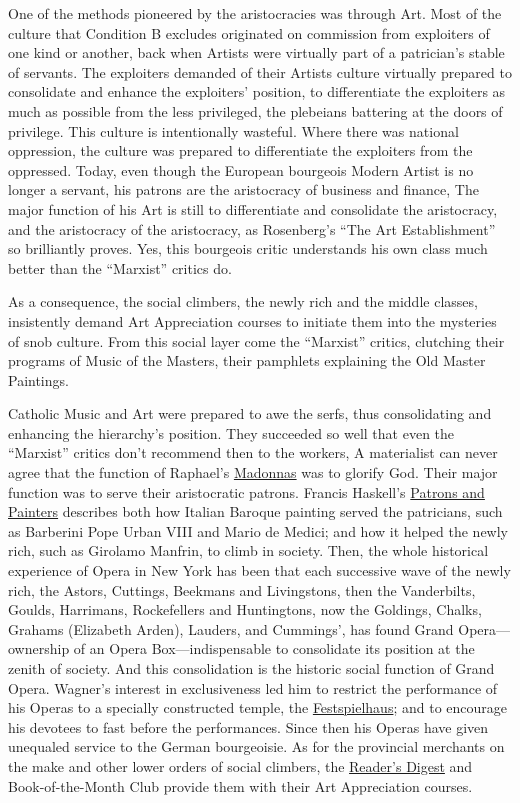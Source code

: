 One of the methods pioneered by the aristocracies was through Art. Most of the culture that Condition B excludes originated on commission from exploiters of one kind or another, back when Artists were virtually part of a patrician's stable of servants. The exploiters demanded of their Artists culture virtually prepared to consolidate and enhance the exploiters' position, to differentiate the exploiters as much as possible from the less privileged, the plebeians battering at the doors of privilege. This culture is intentionally wasteful. Where there was national oppression, the culture was prepared to differentiate the exploiters from the oppressed. Today, even though the European bourgeois Modern Artist is no longer a servant, his patrons are the aristocracy of business and finance, The major function of his Art is still to differentiate and consolidate the aristocracy, and the aristocracy of the aristocracy, as Rosenberg's \enquote{The Art Establishment} so brilliantly proves. Yes, this bourgeois critic understands his own class much better than the \enquote{Marxist} critics do.

As a consequence, the social climbers, the newly rich and the middle classes, insistently demand Art Appreciation courses to initiate them into the mysteries of snob culture. From this social layer come the \enquote{Marxist} critics, clutching their programs of Music of the Masters, their pamphlets explaining the Old Master Paintings. 

Catholic Music and Art were prepared to awe the serfs, thus consolidating and enhancing the hierarchy's position. They succeeded so well that even the \enquote{Marxist} critics don't recommend then to the workers, A materialist can never agree that the function of Raphael's \uline{Madonnas} was to glorify God. Their major function was to serve their aristocratic patrons. Francis Haskell's \uline{Patrons and Painters} describes both how Italian Baroque painting served the patricians, such as Barberini Pope Urban VIII and Mario de Medici; and how it helped the newly rich, such as Girolamo Manfrin, to climb in society. Then, the whole historical experience of Opera in New York has been that each successive wave of the newly rich, the Astors, Cuttings, Beekmans and Livingstons, then the Vanderbilts, Goulds, Harrimans, Rockefellers and Huntingtons, now the Goldings, Chalks, Grahams (Elizabeth Arden), Lauders, and Cummings', has found Grand Opera---ownership of an Opera Box---indispensable to consolidate its position at the zenith of society. And this consolidation is the historic social function of Grand Opera. Wagner's interest in exclusiveness led him to restrict the performance of his Operas to a specially constructed temple, the \uline{Festspielhaus}; and to encourage his devotees to fast before the performances. Since then his Operas have given unequaled service to the German bourgeoisie. As for the provincial merchants on the make and other lower orders of social climbers, the \uline{Reader's Digest} and Book-of-the-Month Club provide them with their Art Appreciation courses.

